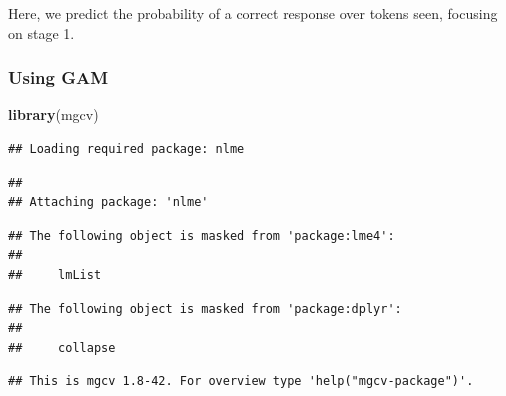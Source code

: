 \documentclass[
]{article}
\newenvironment{Shaded}{\begin{snugshade}}{\end{snugshade}}
\newcommand{\FunctionTok}[1]{\textcolor[rgb]{0.13,0.29,0.53}{\textbf{#1}}}
\newcommand{\NormalTok}[1]{#1}
\begin{document}
Here, we predict the probability of a correct response over tokens seen,
focusing on stage 1.

\hypertarget{using-gam}{%
\subsubsection{Using GAM}\label{using-gam}}

\begin{Shaded}
\begin{Highlighting}[]
\FunctionTok{library}\NormalTok{(mgcv)}
\end{Highlighting}
\end{Shaded}

\begin{verbatim}
## Loading required package: nlme
\end{verbatim}

\begin{verbatim}
## 
## Attaching package: 'nlme'
\end{verbatim}

\begin{verbatim}
## The following object is masked from 'package:lme4':
## 
##     lmList
\end{verbatim}

\begin{verbatim}
## The following object is masked from 'package:dplyr':
## 
##     collapse
\end{verbatim}

\begin{verbatim}
## This is mgcv 1.8-42. For overview type 'help("mgcv-package")'.
\end{verbatim}
\end{document}
